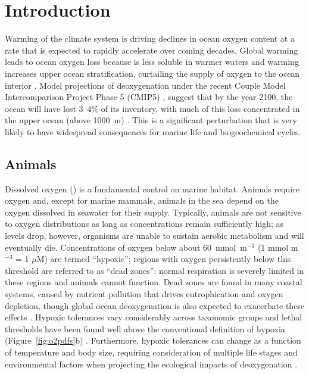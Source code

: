 \documentclass[draft,linenumbers]{report_chapter}
\begin{document}
\section{Introduction}\label{loc:intro}

Warming of the climate system is driving declines in ocean oxygen content at a rate that is expected to rapidly accelerate over coming decades.
Global warming leads to ocean oxygen loss because  is less soluble in warmer waters and warming increases upper ocean stratification, curtailing the supply of oxygen to the ocean interior \citep{Keeling-Kortzinger-etal-2010}.
Model projections of deoxygenation under the recent Couple Model Intercomparison Project Phase 5 (CMIP5) \citep{Taylor-Stouffer-etal-2012}, suggest that by the year 2100, the ocean will have lost 3--4\% of its  inventory, with much of this loss concentrated in the upper ocean (above 1000~m) \citep{Bopp-Resplandy-etal-2013,Cocco-Joos-etal-2013}.
This is a significant perturbation that is very likely to have widespread consequences for marine life and biogeochemical cycles.

\subsection{Animals}

Dissolved oxygen () is a fundamental control on marine habitat.
Animals require oxygen and, except for marine mammals, animals in the sea depend on the oxygen dissolved in seawater for their supply.
Typically, animals are not sensitive to oxygen distributions as long as concentrations remain sufficiently high; as  levels drop, however, organisms are unable to sustain aerobic metabolism and will eventually die.
Concentrations of oxygen below about 60~mmol~m$^{-3}$ (1  mmol m$^{-3}$ = 1
$\mu$M) are termed ``hypoxic''; regions with oxygen persistently below this threshold are referred to as ``dead zones'': normal respiration is severely limited in these regions and animals cannot function.
Dead zones are found in many coastal systems, caused by nutrient pollution that drives eutrophication and oxygen depletion, though global ocean deoxygenation is also expected to exacerbate these effects \citep{Rabalais-Turner-etal-2002,Diaz-Rosenberg-2008}.
Hypoxic tolerances vary considerably across taxonomic groups and lethal thresholds have been found well above the conventional definition of hypoxia (Figure~\ref{fig:o2pdfs}b) \citep{Vaquer-Sunyer-Duarte-2008}.
Furthermore, hypoxic tolerances can change as a function of temperature and body size, requiring consideration of multiple life stages and environmental factors when projecting the ecological impacts of deoxygenation \citep{Portner-Farrell-2008,Deutsch-Ferrel-etal-2015}.
\end{document}
